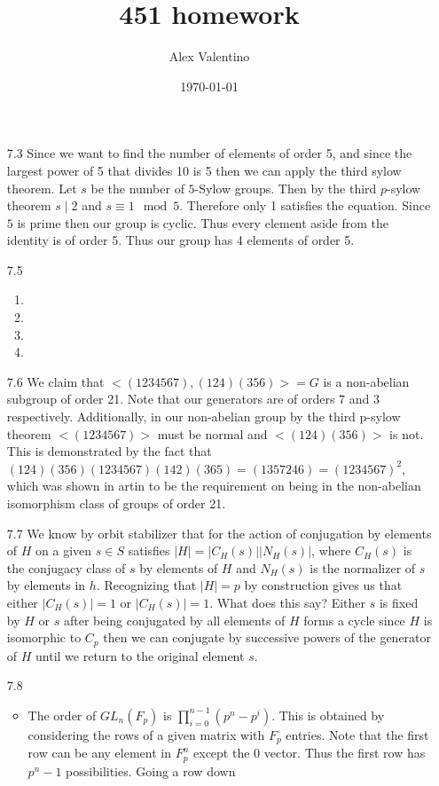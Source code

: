 \documentclass[12pt, letterpaper]{article}
\date{\today}
\author{Alex Valentino}
\title{451 homework}
\begin{document}
\begin{enumerate}
	\item[7.3] Since we want to find the number of elements of order 5, and since the largest power of 5 that divides 10 is 5 then we can apply the third sylow theorem.  Let $s$ be the number of $5$-Sylow groups.  Then by the third $p$-sylow theorem $s \mid 2$ and $s \equiv 1 \mod 5$.  Therefore
	only 1 satisfies the equation.  Since $5$ is prime then our group is cyclic.  Thus every element aside from the identity is of order 5.  Thus our 
	group has 4 elements of order 5. 
	\item[7.5]
	\begin{enumerate}
		\item
		\item 
		\item 
		\item 
	\end{enumerate}
	\item[7.6] We claim that $<(1234567),(124)(356)> = G$ is a non-abelian subgroup of order 21.  Note that our generators are of orders 7 and 3 respectively.  Additionally, in our non-abelian group by the third p-sylow theorem $<(1234567)>$ must be normal and $<(124)(356)>$ is not.  This is demonstrated by the fact that $(124)(356)(1234567)(142)(365) = (1357246) = (1234567)^2$, which was shown in artin to be the requirement on being in the 
	non-abelian isomorphism class of groups of order 21.  
	\item[7.7] We know by orbit stabilizer that for the action of conjugation by elements of $H$ on a given $s \in S$ satisfies $|H| = |C_H(s)||N_H(s)|$, where $C_H(s)$ is the conjugacy class of $s$ by elements of $H$ and 
	$N_H(s)$ is the normalizer of $s$ by elements in $h$.  Recognizing 
	that $|H| = p$ by construction gives us that either $|C_H(s)| = 1$ or $|C_H(s)| = 1$.  What does this say?  Either $s$ is fixed by $H$ or $s$ 
	after being conjugated by all elements of $H$ forms a cycle since $H$ 
	is isomorphic to $C_p$ then we can conjugate by successive powers of the generator of $H$ until we return to the original element $s$.    
	\item[7.8] 
	\begin{itemize}
		\item The order of $GL_n(F_p)$ is $\prod_{i=0}^{n-1}(p^n - p^i)$.  This is obtained by considering the rows of a given matrix with $F_p$ entries.  Note that the first row can be any element in $F_p^n$ except the 0 vector.  Thus the first row has $p^n-1$ possibilities.  Going a row down

\end{itemize}
\end{enumerate}
\end{document}
